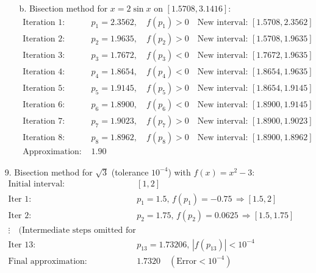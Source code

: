 \begin{enumerate}
\begin{itemize}
        \item[b.] Bisection method for \( x = 2\sin x \) on
          \([1.5708, 3.1416]\):
          \[
            \begin{aligned}
              \text{Iteration 1: } & p_1 = 2.3562, \quad f(p_1) > 0
              \quad \text{New interval: } [1.5708, 2.3562] \\
              \text{Iteration 2: } & p_2 = 1.9635, \quad f(p_2) > 0
              \quad \text{New interval: } [1.5708, 1.9635] \\
              \text{Iteration 3: } & p_3 = 1.7672, \quad f(p_3) < 0
              \quad \text{New interval: } [1.7672, 1.9635] \\
              \text{Iteration 4: } & p_4 = 1.8654, \quad f(p_4) < 0
              \quad \text{New interval: } [1.8654, 1.9635] \\
              \text{Iteration 5: } & p_5 = 1.9145, \quad f(p_5) > 0
              \quad \text{New interval: } [1.8654, 1.9145] \\
              \text{Iteration 6: } & p_6 = 1.8900, \quad f(p_6) < 0
              \quad \text{New interval: } [1.8900, 1.9145] \\
              \text{Iteration 7: } & p_7 = 1.9023, \quad f(p_7) > 0
              \quad \text{New interval: } [1.8900, 1.9023] \\
              \text{Iteration 8: } & p_8 = 1.8962, \quad f(p_8) > 0
              \quad \text{New interval: } [1.8900, 1.8962] \\
              \text{Approximation: } & \boxed{1.90}
            \end{aligned}
          \]
      \end{itemize}

    \item[9.] Bisection method for \( \sqrt{3} \) (tolerance \(
      10^{-4} \)) with \( f(x) = x^2 - 3 \):
      \[
        \begin{aligned}
          \text{Initial interval: } & [1, 2] \\
          \text{Iter 1: } & p_1 = 1.5, \, f(p_1) = -0.75 \,
          \Rightarrow [1.5, 2] \\
          \text{Iter 2: } & p_2 = 1.75, \, f(p_2) = 0.0625 \,
          \Rightarrow [1.5, 1.75] \\
          \vdots \quad \text{(Intermediate steps omitted for brevity)} \\
          \text{Iter 13: } & p_{13} = 1.73206, \, |f(p_{13})| < 10^{-4} \\
          \text{Final approximation: } & \boxed{1.7320} \quad
          (\text{Error} < 10^{-4})
        \end{aligned}
      \]


\end{enumerate}
